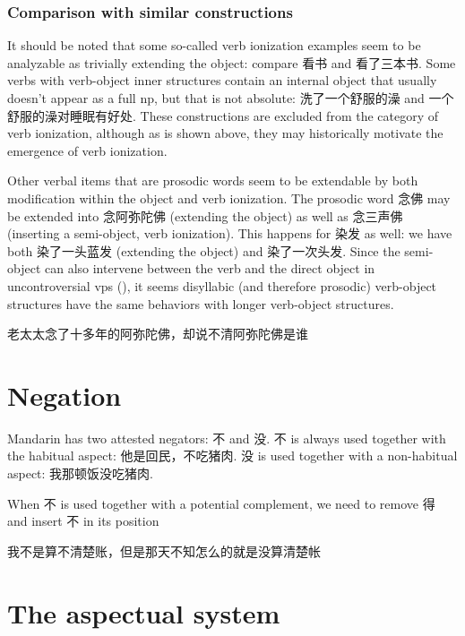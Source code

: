 \documentclass[UTF8, a4paper, oneside, scheme=plain]{ctexrep}
\begin{document}
\subsubsection{Comparison with similar constructions}\label{sec:verb-phrase.ionization.similar}

It should be noted that some so-called verb ionization examples 
seem to be analyzable as 
trivially extending the object: 
compare 看书 and 看了三本书.
Some verbs with verb-object inner structures 
contain an internal object that usually doesn't appear as a full \acs{np}, 
but that is not absolute: 
洗了一个舒服的澡 and 一个舒服的澡对睡眠有好处.
These constructions are excluded from the category of verb ionization,
although as is shown above, 
they may historically motivate the emergence of verb ionization.

Other verbal items that are prosodic words
seem to be extendable by 
both modification within the object 
and verb ionization.
The prosodic word 念佛 may be extended into 念阿弥陀佛 (extending the object)
as well as 念三声佛 (inserting a semi-object, verb ionization).
This happens for 染发 as well: 
we have both 染了一头蓝发 (extending the object) 
and 染了一次头发.
Since the semi-object can also intervene
between the verb and the direct object in uncontroversial \acs{vp}s 
(), 
it seems disyllabic (and therefore prosodic) verb-object structures 
have the same behaviors with 
longer verb-object structures.

\begin{exe}
    \ex\label{ex:verb-phrase.separation.nianfo-full-vp} 老太太念了十多年的阿弥陀佛，却说不清阿弥陀佛是谁
\end{exe}

\section{Negation}

Mandarin has two attested negators: 不 and 没.
不 is always used together with the habitual aspect:
他是回民，不吃猪肉.
没 is used together with a non-habitual aspect:
我那顿饭没吃猪肉.

When 不 is used together with a potential complement, 
we need to remove 得 and insert 不 in its position

我不是算不清楚账，但是那天不知怎么的就是没算清楚帐

\section{The aspectual system}\label{sec:aspectual}
\end{document}

